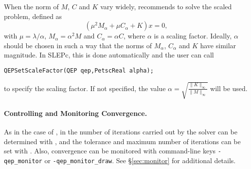 When the norm of $M$, $C$ and $K$ vary widely, \cite{Tisseur:2000:BEC} recommends to solve the scaled problem, defined as 
\begin{equation}
(\mu^2M_\alpha+\mu C_\alpha+K)x=0,\label{eq:scaled}
\end{equation}
with $\mu=\lambda/\alpha$, $M_\alpha=\alpha^2M$ and $C_\alpha=\alpha C$, where $\alpha$ is a scaling factor. Ideally, $\alpha$ should be chosen in such a way that the norms of $M_\alpha$, $C_\alpha$ and $K$ have similar magnitude. In SLEPc, this is done automatically and the user can call
	\begin{Verbatim}[fontsize=\small]
	QEPSetScaleFactor(QEP qep,PetscReal alpha);
	\end{Verbatim}
to specify the scaling factor. If not specified, the value $\alpha=\sqrt{\frac{\|K\|_\infty}{\|M\|_\infty}}$ will be used.


\paragraph{Controlling and Monitoring Convergence.}

As in the case of , in  the number of iterations carried out by the solver can be determined with , and the tolerance and maximum number of iterations can be set with . Also, convergence can be monitored with command-line keys \Verb!-qep_monitor! or \Verb!-qep_monitor_draw!. See \S\ref{sec:monitor} for additional details.


